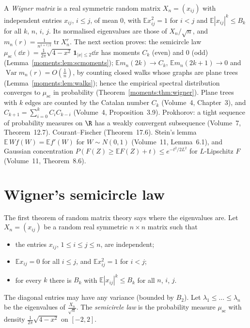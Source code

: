 \begin{reminder}
A \emph{Wigner matrix} is a real symmetric random matrix $X_n=(x_{ij})$ with independent entries $x_{ij}$, $i\le j$, of mean $0$, with $\mathbb Ex_{ij}^2=1$ for $i<j$ and $\mathbb E|x_{ij}|^k\le B_k$ for all $k$, $n$, $i$, $j$. Its
normalised eigenvalues are those of $X_n/\sqrt n$, and $m_n(r)=\frac1{n^{1+r/2}}\operatorname{tr}X_n^r$. The next section proves: the semicircle law $\mu_{\mathrm{sc}}(\dd x)=\frac1{2\pi}\sqrt{4-x^2}\,\mathbf 1_{|x|\le2}\dd x$ has moments $C_k$
(even) and $0$ (odd) (Lemma~\ref{moments:lem:scmoments}); $\mathbb Em_n(2k)\to C_k$, $\mathbb Em_n(2k+1)\to0$ and $\operatorname{Var}m_n(r)=O(\frac1n)$, by counting closed walks whose graphs are plane trees (Lemma~\ref{moments:lem:walks}); hence the empirical spectral
distribution converges to $\mu_{\mathrm{sc}}$ in probability (Theorem~\ref{moments:thm:wigner}). Plane trees with $k$ edges are counted by the Catalan number $C_k$ (Volume~4, Chapter~3), and $C_{k+1}=\sum_{i=0}^kC_iC_{k-i}$ (Volume~4,
Proposition~3.9). Prokhorov: a tight sequence of probability measures on $\R$ has a weakly convergent subsequence (Volume~7, Theorem~12.7). Courant--Fischer (Theorem~17.6). Stein's lemma
$\mathbb E\,Wf(W)=\mathbb Ef'(W)$ for $W\sim N(0,1)$ (Volume~11, Lemma~6.1), and Gaussian concentration $P(F(Z)\ge\mathbb EF(Z)+t)\le e^{-t^2/2L^2}$ for $L$-Lipschitz $F$ (Volume~11, Theorem~8.6).
\end{reminder}

\section{Wigner's semicircle law}

The first theorem of random matrix theory says where the eigenvalues are. Let $X_n=(x_{ij})$ be a random real symmetric $n\times n$ matrix such that
\begin{itemize}
\item the entries $x_{ij}$, $1\le i\le j\le n$, are independent;
\item $\mathbb Ex_{ij}=0$ for all $i\le j$, and $\mathbb Ex_{ij}^2=1$ for $i<j$;
\item for every $k$ there is $B_k$ with $\mathbb E|x_{ij}|^k\le B_k$ for all $n$, $i$, $j$.
\end{itemize}
The diagonal entries may have any variance (bounded by $B_2$). Let $\lambda_1\le\dots\le\lambda_n$ be the eigenvalues of $\frac{X_n}{\sqrt n}$. The
\emph{semicircle law} is the probability measure $\mu_{\mathrm{sc}}$ with density $\frac1{2\pi}\sqrt{4-x^2}$ on $[-2,2]$.

